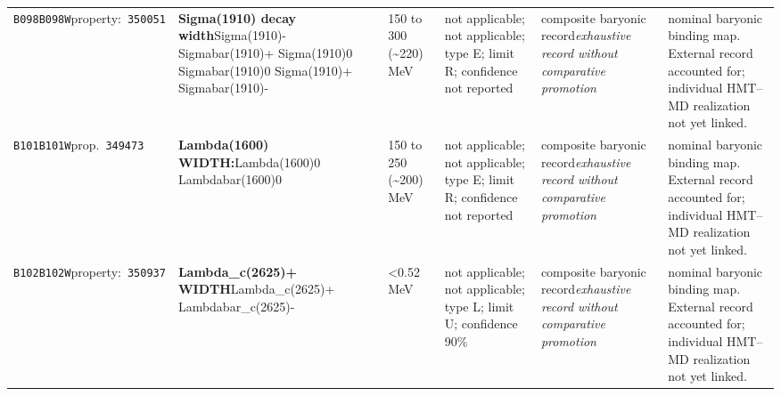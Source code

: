 \begin{landscape}
\begin{longtable}{L{1.85cm}L{4.45cm}L{2.35cm}L{4.05cm}L{3.35cm}L{7.15cm}}
\texttt{B098}\newline \texttt{B098W}\newline property:\ \texttt{350051} & \textbf{Sigma(1910) decay width}\newline Sigma(1910)- \textbar{}\allowbreak{} Sigmabar(1910)+ \textbar{}\allowbreak{} Sigma(1910)0 \textbar{}\allowbreak{} Sigmabar(1910)0 \textbar{}\allowbreak{} Sigma(1910)+ \textbar{}\allowbreak{} Sigmabar(1910)- & 150 to 300 (\textasciitilde{}220)\,MeV & not applicable; not applicable; type E; limit R; confidence not reported & composite baryonic record\newline \emph{exhaustive record without comparative promotion} & nominal baryonic binding map. External record accounted for; individual HMT--MD realization not yet linked. \\
\texttt{B101}\newline \texttt{B101W}\newline prop.\ \texttt{349473} & \textbf{Lambda(1600) WIDTH:}\newline Lambda(1600)0 \textbar{}\allowbreak{} Lambdabar(1600)0 & 150 to 250 (\textasciitilde{}200)\,MeV & not applicable; not applicable; type E; limit R; confidence not reported & composite baryonic record\newline \emph{exhaustive record without comparative promotion} & nominal baryonic binding map. External record accounted for; individual HMT--MD realization not yet linked. \\
\texttt{B102}\newline \texttt{B102W}\newline property:\ \texttt{350937} & \textbf{Lambda\_\allowbreak{}c(2625)+ WIDTH}\newline Lambda\_\allowbreak{}c(2625)+ \textbar{}\allowbreak{} Lambdabar\_\allowbreak{}c(2625)- & \textless{}0.52\,MeV & not applicable; not applicable; type L; limit U; confidence 90\% & composite baryonic record\newline \emph{exhaustive record without comparative promotion} & nominal baryonic binding map. External record accounted for; individual HMT--MD realization not yet linked. \\

\end{longtable}
\end{landscape}
